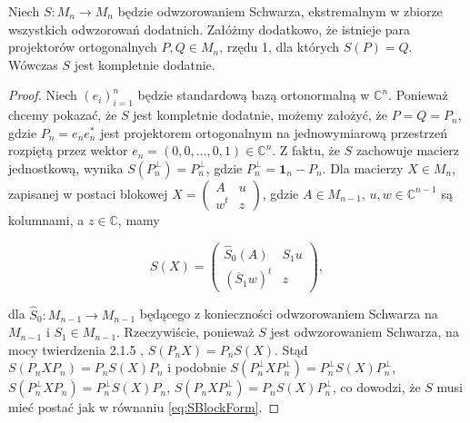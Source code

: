 \begin{Theorem}
\label{thm:ExtremalSchwarz}
Niech $S: M_{n} \rightarrow M_{n}$
będzie odwzorowaniem Schwarza, ekstremalnym w zbiorze wszystkich odwzorowań
dodatnich. Załóżmy dodatkowo, że
istnieje para projektorów ortogonalnych $P, Q \in M_{n}$, rzędu 1,
dla których $S(P) = Q$.
Wówczas $S$ jest kompletnie dodatnie.
\end{Theorem}
\begin{proof}
Niech $(e_{i})_{i=1}^{n}$
będzie standardową bazą ortonormalną w $\mathbb{C}^{n}$.
Ponieważ chcemy pokazać, że $S$ jest kompletnie dodatnie,
możemy założyć, że $P = Q = P_{n}$,
gdzie $P_{n} = e_{n} e_{n}^{*}$ jest projektorem ortogonalnym na jednowymiarową
przestrzeń rozpiętą przez wektor $e_{n} = (0,0,\ldots,0,1) \in \mathbb{C}^{n}$.
Z faktu, że $S$ zachowuje macierz jednostkową, wynika
$S(P_{n}^{\perp}) = P_{n}^{\perp}$,
gdzie $P_{n}^{\perp} = \mathbf{1}_{n} - P_{n}$.
Dla macierzy $X \in M_{n}$,
zapisanej w postaci blokowej
$X = \left( \begin{smallmatrix} A & u \\ w^{t} & z \end{smallmatrix} \right)$,
gdzie $A \in M_{n-1}$, $u, w \in \mathbb{C}^{n-1}$ są kolumnami, a
$z \in \mathbb{C}$, mamy
\begin{linenomath*}
 \begin{equation}
\label{eq:SBlockForm}
    S (X) = \begin{pmatrix}
        \hat{S}_{0}(A) & S_{1} u \\
        (\overline{S}_{1} w)^{t} & z
    \end{pmatrix},
 \end{equation}
\end{linenomath*}
dla $\hat{S}_{0}: M_{n-1} \rightarrow M_{n-1}$ będącego z konieczności
odwzorowaniem Schwarza na $M_{n-1}$ i $S_{1} \in M_{n-1}$.
Rzeczywiście, ponieważ $S$ jest odwzorowaniem Schwarza,
na mocy twierdzenia 2.1.5 \cite{Stormer2013},
$S(P_{n} X) = P_{n} S(X)$.
Stąd
$S(P_{n} X P_{n}) = P_{n} S(X) P_{n}$ i podobnie
$S(P_{n}^{\perp} X P_{n}^{\perp}) = P_{n}^{\perp} S(X) P_{n}^{\perp}$,
$S(P_{n}^{\perp} X P_{n}) = P_{n}^{\perp} S(X) P_{n}$,
$S(P_{n} X P_{n}^{\perp}) = P_{n} S(X) P_{n}^{\perp}$,
co dowodzi, że $S$ musi mieć postać jak w równaniu \eqref{eq:SBlockForm}.


\end{proof}

